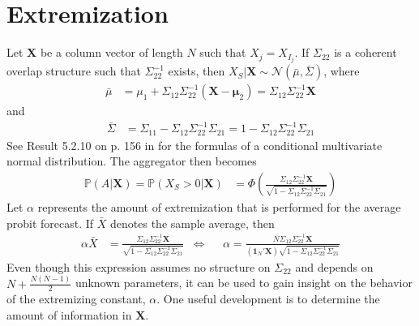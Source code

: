 \documentclass[11pt,twoside]{article}
\renewcommand{\P}{\mathbb{P}}
\begin{document}
\section{Extremization}
Let $\boldsymbol{X}$ be a column vector of length $N$ such that $X_j = X_{I_j}$. If $\Sigma_{22}$ is a coherent overlap structure such that $\Sigma_{22}^{-1}$ exists, then $X_{S} | \boldsymbol{X} \sim \mathcal{N}(\bar{\mu}, \bar{\Sigma})$, where
\begin{align}
\bar{\mu} &= \mu_1 + \Sigma_{12} \Sigma_{22}^{-1} (\boldsymbol{X} - \boldsymbol{\mu}_2) =  \Sigma_{12} \Sigma_{22}^{-1} \boldsymbol{X} \label{condMu}
\end{align}
and
\begin{align}
 \bar{\Sigma}&= \Sigma_{11} - \Sigma_{12} \Sigma_{22}^{-1} \Sigma_{21} =1 - \Sigma_{12} \Sigma_{22}^{-1} \Sigma_{21}  \label{condSigma}
\end{align}
See Result 5.2.10 on p. 156 in \cite{ravishanker2001first} for the formulas of a conditional multivariate normal distribution. The aggregator then becomes 
\begin{align*}
\P\left(A  \bigg| \boldsymbol{X}\right)  = \P\left(X_{S} > 0 \bigg| \boldsymbol{X}\right) &= \Phi\left( \frac{\Sigma_{12} \Sigma_{22}^{-1} \boldsymbol{X}}{\sqrt{1 - \Sigma_{12} \Sigma_{22}^{-1} \Sigma_{21}}}\right)
\end{align*}
Let $\alpha$ represents the amount of extremization that is performed for the average probit forecast. If $\bar{X}$ denotes the sample average, then
\begin{align}
\alpha \bar{X}&=  \frac{\Sigma_{12} \Sigma_{22}^{-1} \boldsymbol{X}}{\sqrt{1 - \Sigma_{12} \Sigma_{22}^{-1} \Sigma_{21}}}  &\Leftrightarrow&& \alpha  = \frac{N \Sigma_{12} \Sigma_{22}^{-1} \boldsymbol{X}}{\left(\boldsymbol{1}_N' \boldsymbol{X} \right) \sqrt{1 - \Sigma_{12} \Sigma_{22}^{-1} \Sigma_{21}}} \label{alpha}
\end{align}
Even though this expression assumes no structure on $\Sigma_{22}$ and depends on $N +\frac{N(N-1)}{2}$ unknown parameters, it can be used to gain insight on the behavior of the extremizing constant, $\alpha$. One useful development is to determine the amount of information in $\boldsymbol{X}$. 
\end{document}
